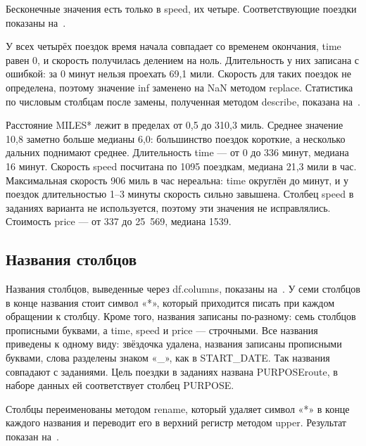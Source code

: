 \documentclass[a4paper,14pt]{extarticle}
\begin{document}
Бесконечные значения есть только в speed, их четыре. Соответствующие поездки показаны на~.


У всех четырёх поездок время начала совпадает со временем окончания, time равен 0, и скорость получилась делением на ноль. Длительность у них записана с ошибкой: за 0 минут нельзя проехать 69,1 мили. Скорость для таких поездок не определена, поэтому значение inf заменено на NaN методом replace. Статистика по числовым столбцам после замены, полученная методом describe, показана на~.


Расстояние MILES* лежит в пределах от 0,5 до 310,3 миль. Среднее значение 10,8 заметно больше медианы 6,0: большинство поездок короткие, а несколько дальних поднимают среднее. Длительность time — от 0 до 336 минут, медиана 16 минут. Скорость speed посчитана по 1095 поездкам, медиана 21,3 мили в час. Максимальная скорость 906 миль в час нереальна: time округлён до минут, и у поездок длительностью 1–3 минуты скорость сильно завышена. Столбец speed в заданиях варианта не используется, поэтому эти значения не исправлялись. Стоимость price — от 337 до 25~569, медиана 1539.

\subsection{Названия столбцов}

Названия столбцов, выведенные через df.columns, показаны на~. У семи столбцов в конце названия стоит символ «*», который приходится писать при каждом обращении к столбцу. Кроме того, названия записаны по-разному: семь столбцов прописными буквами, а time, speed и price — строчными. Все названия приведены к одному виду: звёздочка удалена, названия записаны прописными буквами, слова разделены знаком «\_», как в START\_DATE. Так названия совпадают с заданиями. Цель поездки в заданиях названа PURPOSEroute, в наборе данных ей соответствует столбец PURPOSE.


Столбцы переименованы методом rename, который удаляет символ «*» в конце каждого названия и переводит его в верхний регистр методом upper. Результат показан на~.
\end{document}
